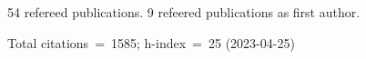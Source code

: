 54 refereed publications. 9 refeered publications as first author.

Total citations~=~1585; h-index~=~25 (2023-04-25)